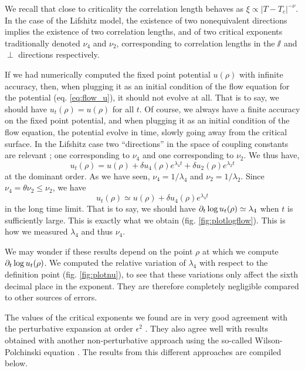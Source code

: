 We recall that close to criticality the correlation length behaves as $\xi \propto |T - T_c|^{-\nu}$. 
In the case of the Lifshitz model, the existence of two nonequivalent directions implies the existence of two correlation lengths, and of two critical exponents traditionally denoted $\nu_4$ and $\nu_2$, corresponding to correlation lengths in the $\sslash$ and $\perp$ directions respectively. 

If we had numerically computed the fixed point potential $u(\rho)$ with infinite accuracy, then, when plugging it as an initial condition of the flow equation for the potential (eq. \eqref{eq:flow_u}), it should not evolve at all. That is to say, we should have $u_t(\rho) = u(\rho)$ for all $t$. 
Of course, we always have a finite accuracy on the fixed point potential, and when plugging it as an initial condition of the flow equation, the potential evolve in time, slowly going away from the critical surface. In the Lifshitz case two ``directions'' in the space of coupling constants are relevant ; one corresponding to $\nu_4$ and one corresponding to $\nu_2$. We thus have, 
\begin{equation}
u_t(\rho) = u(\rho) + \delta u_4(\rho) e^{\lambda_4 t} + \delta u_2(\rho) e^{\lambda_2 t}
\end{equation}
at the dominant order.
As we have seen, $\nu_4 = 1/\lambda_4$ and $\nu_2 = 1/\lambda_2$. Since $\nu_4 = \theta \nu_2 \leq \nu_2$, we have
\begin{equation}
u_t(\rho) \simeq u(\rho) + \delta u_4(\rho) e^{\lambda_4 t} 
\end{equation}
in the long time limit. That is to say, we should have $\partial_{t} \log{u_t(\rho)} \simeq \lambda_4$ when $t$ is sufficiently large. This is exactly what we obtain (fig. \eqref{fig:plotlogflow}).
This is how we measured $\lambda_4$ and thus $\nu_4$. 

We may wonder if these results depend on the point $\rho$ at which we compute $\partial_{t} \log{u_t(\rho)}$. We computed the relative variation of $\lambda_4$ with respect to the definition point (fig. \eqref{fig:plotnu}), to see that these variations only affect the sixth decimal place in the exponent. They are therefore completely negligible compared to other sources of errors.

The values of the critical exponents we found are in very good agreement with the perturbative expansion at order $\epsilon^2$ \cite{MouhannaLif}.
They also agree well with results obtained with another non-perturbative approach using the so-called Wilson-Polchinski equation \cite{BervillierLif}.  The results from this different approaches are compiled below.

